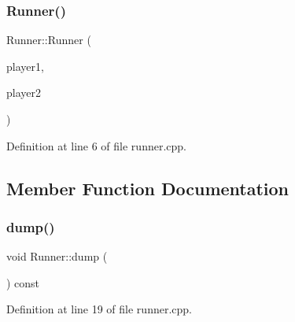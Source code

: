 \subsubsection{\texorpdfstring{Runner()}{Runner()}}
{\footnotesize\ttfamily Runner\+::\+Runner (\begin{DoxyParamCaption}\item[{\hyperlink{runner_8h_afe5d34ded509e15b538d78ebe5cb3db6}{Player\+Ptr}}]{player1,  }\item[{\hyperlink{runner_8h_afe5d34ded509e15b538d78ebe5cb3db6}{Player\+Ptr}}]{player2 }\end{DoxyParamCaption})}



Definition at line 6 of file runner.\+cpp.



\subsection{Member Function Documentation}
\mbox{\label{class_runner_a4cc0bf3493f80516761032d55cc2ffab}} 
\subsubsection{\texorpdfstring{dump()}{dump()}}
{\footnotesize\ttfamily void Runner\+::dump (\begin{DoxyParamCaption}{ }\end{DoxyParamCaption}) const}



Definition at line 19 of file runner.\+cpp.

